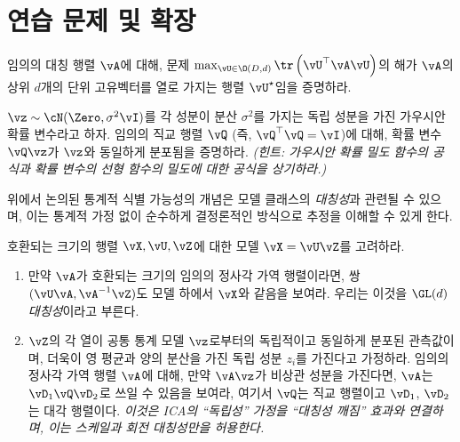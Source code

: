 \documentclass[../../book-main_ko.tex]{subfiles}
\begin{document}
\section{연습 문제 및 확장}


\begin{exercise}\label{exercise:principal-components-derivation}
    임의의 대칭 행렬 \(\vA\)에 대해, 문제 \(\max_{\vU \in \O(D, d)}\tr\left(\vU^{\top}\vA\vU\right)\)의 해가 \(\vA\)의 상위 \(d\)개의 단위 고유벡터를 열로 가지는 행렬 \(\vU^{\star}\)임을 증명하라.
\end{exercise}

\begin{exercise}\label{exercise:gaussian-rot-invar}
    $\vz \sim \cN(\Zero, \sigma^2 \vI)$를 각 성분이 분산 $\sigma^2$를 가지는 독립 성분을 가진 가우시안 확률 변수라고 하자. 임의의 직교 행렬 $\vQ$ (즉, $\vQ^\top \vQ = \vI$)에 대해, 확률 변수 $\vQ \vz$가 $\vz$와 동일하게 분포됨을 증명하라. \textit{(힌트: 가우시안 확률 밀도 함수의 공식과 확률 변수의 선형 함수의 밀도에 대한 공식을 상기하라.)}
\end{exercise}

\begin{exercise}\label{exercise:symmetry-identifiability}
    위에서 논의된 통계적 식별 가능성의 개념은 모델 클래스의 \textit{대칭성}과 관련될 수 있으며, 이는 통계적 가정 없이 순수하게 결정론적인 방식으로 추정을 이해할 수 있게 한다.

    호환되는 크기의 행렬 $\vX, \vU, \vZ$에 대한 모델 $\vX = \vU \vZ$를 고려하라.
    \begin{enumerate}
        \item 만약 $\vA$가 호환되는 크기의 임의의 정사각 가역 행렬이라면, 쌍 $(\vU \vA, \vA^{-1} \vZ)$도 모델 하에서 $\vX$와 같음을 보여라. 우리는 이것을 \textit{$\GL(d)$ 대칭성}이라고 부른다.
        \item $\vZ$의 각 열이 공통 통계 모델 $\vz$로부터의 독립적이고 동일하게 분포된 관측값이며, 더욱이 영 평균과 양의 분산을 가진 독립 성분 $z_i$를 가진다고 가정하라. 임의의 정사각 가역 행렬 $\vA$에 대해, 만약 $\vA \vz$가 비상관 성분을 가진다면, $\vA$는 $\vD_1 \vQ \vD_2$로 쓰일 수 있음을 보여라, 여기서 $\vQ$는 직교 행렬이고 $\vD_1$, $\vD_2$는 대각 행렬이다. \textit{이것은 ICA의 ``독립성'' 가정을 ``대칭성 깨짐'' 효과와 연결하며, 이는 스케일과 회전 대칭성만을 허용한다.}
    \end{enumerate}

\end{exercise}
\end{document}
